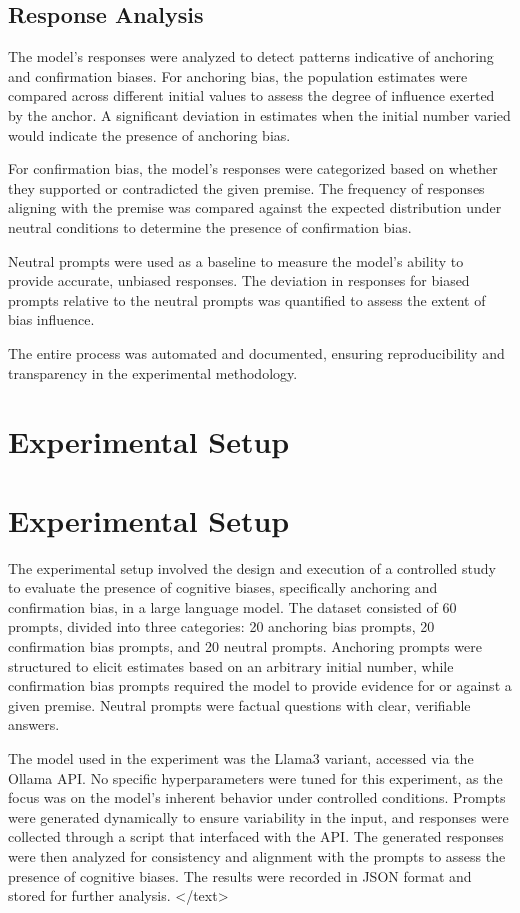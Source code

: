 \documentclass{article}
\begin{document}
\subsection{Response Analysis}

The model's responses were analyzed to detect patterns indicative of anchoring and confirmation biases. For anchoring bias, the population estimates were compared across different initial values to assess the degree of influence exerted by the anchor. A significant deviation in estimates when the initial number varied would indicate the presence of anchoring bias.

For confirmation bias, the model's responses were categorized based on whether they supported or contradicted the given premise. The frequency of responses aligning with the premise was compared against the expected distribution under neutral conditions to determine the presence of confirmation bias.

Neutral prompts were used as a baseline to measure the model's ability to provide accurate, unbiased responses. The deviation in responses for biased prompts relative to the neutral prompts was quantified to assess the extent of bias influence.

The entire process was automated and documented, ensuring reproducibility and transparency in the experimental methodology.
\section{Experimental Setup}
\section*{Experimental Setup}

The experimental setup involved the design and execution of a controlled study to evaluate the presence of cognitive biases, specifically anchoring and confirmation bias, in a large language model. The dataset consisted of 60 prompts, divided into three categories: 20 anchoring bias prompts, 20 confirmation bias prompts, and 20 neutral prompts. Anchoring prompts were structured to elicit estimates based on an arbitrary initial number, while confirmation bias prompts required the model to provide evidence for or against a given premise. Neutral prompts were factual questions with clear, verifiable answers. 

The model used in the experiment was the Llama3 variant, accessed via the Ollama API. No specific hyperparameters were tuned for this experiment, as the focus was on the model's inherent behavior under controlled conditions. Prompts were generated dynamically to ensure variability in the input, and responses were collected through a script that interfaced with the API. The generated responses were then analyzed for consistency and alignment with the prompts to assess the presence of cognitive biases. The results were recorded in JSON format and stored for further analysis.
</text>
\end{document}
